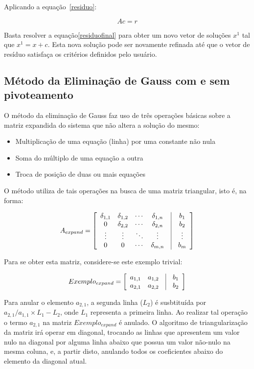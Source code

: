 \documentclass[a4paper,10pt]{report}
\begin{document}
Aplicando a equação~\ref{residuo}:

\begin{equation}
Ac = r
\label{residuofinal}
\end{equation}

Basta resolver a equação\ref{residuofinal} para obter um novo vetor de soluções $x^{1}$ tal que $x^{1} = x + c$. Esta nova solução pode ser novamente refinada até que o vetor de resíduo satisfaça os critérios definidos pelo usuário.

\subsection{Método da Eliminação de Gauss com e sem pivoteamento}

O método da eliminação de Gauss faz uso de três operações básicas sobre a matriz expandida do sistema que não altera a solução do mesmo:

\begin{itemize}
 \item Multiplicação de uma equação (linha) por uma constante não nula
 \item Soma do múltiplo de uma equação a outra
 \item Troca de posição de duas ou mais equações
\end{itemize}

O método utiliza de tais operações na busca de uma matriz triangular, isto é, na forma:

\[
A_{expand} = \left[ \begin{array}{cccccc}
\delta_{1,1} & \delta_{1,2} & \cdots & \delta_{1,n} & \vline & b_{1} \\
0 & \delta_{2,2} & \cdots & \delta_{2,n} & \vline & b_{2} \\
\vdots  & \vdots & \ddots & \vdots & \vline & \vdots \\
0 & 0 & \cdots & \delta_{m,n} & \vline & b_{m} 
\label{arr:triangular}
\end{array}\right]
\]

Para se obter esta matriz, considere-se este exemplo trivial:

\[
Exemplo_{expand} = \left[ \begin{array}{cccc}
a_{1,1} & a_{1,2} & \vline & b_{1} \\
a_{2,1} & a_{2,2} & \vline & b_{2}
\label{arr:triangularexemplo}
\end{array}\right]
\]

Para anular o elemento $a_{2,1}$, a segunda linha ($L_{2}$) é susbtituída por $a_{2,1}/a_{1,1} \times L_{1} - L_{2}$, onde $L_{1}$ representa a primeira linha. Ao realizar tal operação o termo $a_{2,1}$ na matriz  $Exemplo_{expand}$ é anulado. O algoritmo de triangularização da matriz irá operar em diagonal, trocando as linhas que apresentem um valor nulo na diagonal por alguma linha abaixo que possua um valor não-nulo na mesma coluna, e, a partir disto, anulando todos os coeficientes abaixo do elemento da diagonal atual.
\end{document}
